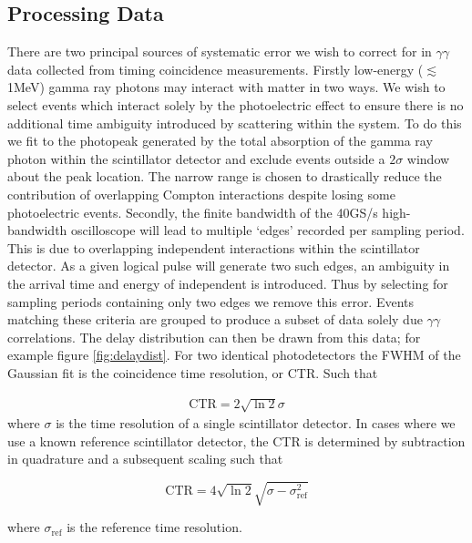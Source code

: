 \subsection{Processing Data}
There are two principal sources of systematic error we wish to correct for in $\gamma\gamma$ data collected from timing coincidence measurements. Firstly low-energy ($\lesssim$1MeV) gamma ray photons may interact with matter in two ways. We wish to select events which interact solely by the photoelectric effect to ensure there is no additional time ambiguity introduced by scattering within the system. To do this we fit to the photopeak generated by the total absorption of the gamma ray photon within the scintillator detector and exclude events outside a $2\sigma$ window about the peak location. The narrow range is chosen to drastically reduce the contribution of overlapping Compton interactions despite losing some photoelectric events. Secondly, the finite bandwidth of the 40GS/s high-bandwidth oscilloscope will lead to multiple `edges' recorded per sampling period. This is due to overlapping independent interactions within the scintillator detector. As a given logical pulse will generate two such edges, an ambiguity in the arrival time and energy of independent is introduced. Thus by selecting for sampling periods containing only two edges we remove this error. Events matching these criteria are grouped to produce a subset of data solely due $\gamma\gamma$ correlations. The delay distribution can then be drawn from this data; for example figure \ref{fig:delaydist}. For two identical photodetectors the FWHM of the Gaussian fit is the coincidence time resolution, or CTR. Such that

\begin{align}
\text{CTR} = 2\sqrt{\ln{2}}\sigma
\end{align}
where $\sigma$ is the time resolution of a single scintillator detector. In cases where we use a known reference scintillator detector, the CTR is determined by subtraction in quadrature and a subsequent scaling such that

\begin{equation}
\text{CTR} = 4\sqrt{\ln{2}}\sqrt{\sigma-\sigma_\textrm{ref}^2}
\label{eqn:ctrfromref}
\end{equation}

where $\sigma_\text{ref}$ is the reference time resolution.

